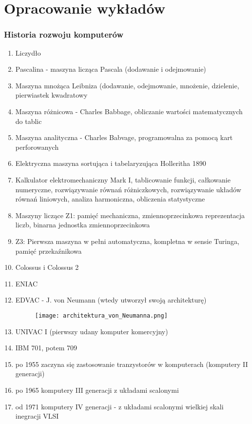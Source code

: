 \documentclass[a4paper,twoside]{article}
\begin{document}
\newpage
\part*{Opracowanie wykładów}
\section*{Historia rozwoju komputerów}
	\begin{enumerate}
    \item Liczydło
    \item Pascalina - maszyna licząca Pascala (dodawanie i odejmowanie)
    \item Maszyna mnożąca Leibniza (dodawanie, odejmowanie, mnożenie, dzielenie, pierwiastek kwadratowy
    \item Maszyna różnicowa - Charles Babbage, obliczanie wartości matematycznych do tablic
    \item Maszyna analityczna - Charles Babvage, programowalna za pomocą kart perforowanych
  	\item Elektryczna maszyna sortująca i tabelaryzująca Holleritha 1890
    \item Kalkulator elektromechaniczny Mark I, tablicowanie funkcji, całkowanie numeryczne, rozwiązywanie równań różniczkowych, rozwiązywanie układów równań liniowych, analiza harmoniczna, obliczenia statystyczne
    \item Maszyny liczące Z1: pamięć mechaniczna, zmiennoprzecinkowa reprezentacja liczb, binarna jednostka zmiennoprzecinkowa
    \item Z3: Pierwsza maszyna w pełni automatyczna, kompletna w sensie Turinga, pamięć przekaźnikowa
    \item Colossus i Colossus 2
    \item ENIAC
    \item EDVAC - J. von Neumann (wtedy utworzył swoją architekturę) \\
    	\begin{figure}[h]
		\centering
		\texttt{[image: architektura\_von\_Neumanna.png]}
		\end{figure}
    \item UNIVAC I (pierwszy udany komputer komercyjny)
    \item IBM 701, potem 709
    \item po 1955 zaczyna się zastosowanie tranzystorów w komputerach (komputery II generacji)
    \item po 1965 komputery III generacji z układami scalonymi
    \item od 1971 komputery IV generacji - z układami scalonymi wielkiej skali inegracji VLSI
    \end{enumerate}
    
\end{document}
